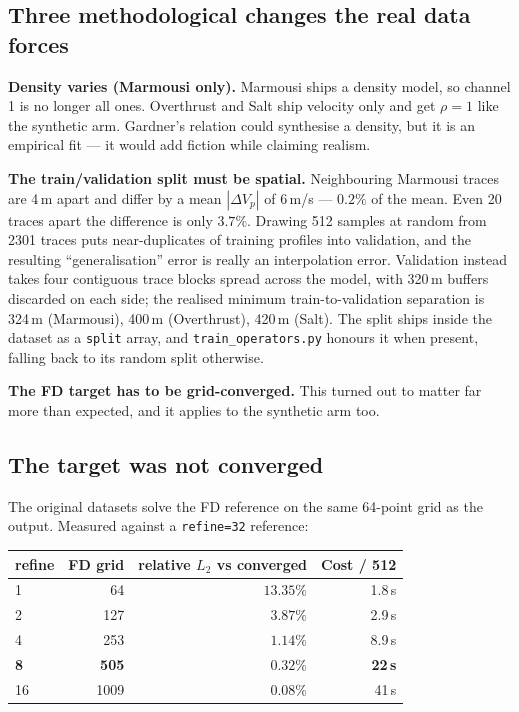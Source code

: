 \documentclass[11pt,a4paper]{article}
\newcommand{\relL}{relative $L_2$}
\begin{document}
\subsection{Three methodological changes the real data forces}

\textbf{Density varies (Marmousi only).} Marmousi ships a density model, so
channel 1 is no longer all ones. Overthrust and Salt ship velocity only and get
$\rho=1$ like the synthetic arm. Gardner's relation could synthesise a density,
but it is an empirical fit --- it would add fiction while claiming realism.

\textbf{The train/validation split must be spatial.} Neighbouring Marmousi
traces are 4\,m apart and differ by a mean $|\Delta V_p|$ of 6\,m/s --- $0.2\%$
of the mean. Even 20 traces apart the difference is only $3.7\%$. Drawing 512
samples at random from 2301 traces puts near-duplicates of training profiles
into validation, and the resulting ``generalisation'' error is really an
interpolation error. Validation instead takes four contiguous trace blocks
spread across the model, with 320\,m buffers discarded on each side; the
realised minimum train-to-validation separation is 324\,m (Marmousi), 400\,m
(Overthrust), 420\,m (Salt). The split ships inside the dataset as a
\texttt{split} array, and \texttt{train\_operators.py} honours it when present,
falling back to its random split otherwise.

\textbf{The FD target has to be grid-converged.} This turned out to matter far
more than expected, and it applies to the synthetic arm too.

\subsection{The target was not converged}\label{sec:refine}

The original datasets solve the FD reference on the same 64-point grid as the
output. Measured against a \texttt{refine=32} reference:

\begin{center}
\small
\begin{tabular}{lrrr}
\toprule
\textbf{refine} & \textbf{FD grid} & \textbf{\relL{} vs converged} & \textbf{Cost / 512}\\
\midrule
1            & 64            & $13.35\%$            & 1.8\,s\\
2            & 127           & $3.87\%$             & 2.9\,s\\
4            & 253           & $1.14\%$             & 8.9\,s\\
\textbf{8}   & \textbf{505}  & $\mathbf{0.32\%}$    & \textbf{22\,s}\\
16           & 1009          & $0.08\%$             & 41\,s\\
\bottomrule
\end{tabular}
\end{center}
\end{document}
